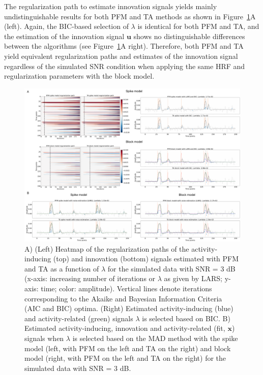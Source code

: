 The regularization path to estimate innovation signals yields mainly undistinguishable results for both PFM and TA methods as shown in Figure~\ref{fig:sim}A (left). Again, the BIC-based selection of $\lambda$ is identical for both PFM and TA, and the estimation of the innovation signal $\mathbf{u}$ shows no distinguishable differences between the algorithms (see Figure~\ref{fig:sim}A right). Therefore, both PFM and TA yield equivalent regularization paths and estimates of the innovation signal regardless of the simulated SNR condition when applying the same HRF and regularization parameters with the block model.


\begin{figure}[H]
    \begin{center}
        \includegraphics[width=\textwidth]{figures/figure_sim.pdf}
    \end{center}
    \caption{A) (Left) Heatmap of the regularization paths of the activity-inducing (top) and innovation (bottom) signals estimated with PFM and TA as a function of $\lambda$ for the simulated data with SNR = 3 dB (x-axis: increasing number of iterations or $\lambda$ as given by LARS; y-axis: time; color: amplitude). Vertical lines denote iterations corresponding to the Akaike and Bayesian Information Criteria (AIC and BIC) optima. (Right) Estimated activity-inducing (blue) and activity-related (green) signals $\lambda$ is selected based on BIC. B) Estimated activity-inducing, innovation and activity-related (fit, $\mathbf{x}$) signals when $\lambda$ is selected based on the MAD method with the spike model (left, with PFM on the left and TA on the right) and block model (right, with PFM on the left and TA on the right) for the simulated data with SNR = 3 dB.}
\label{fig:sim}
\end{figure}

